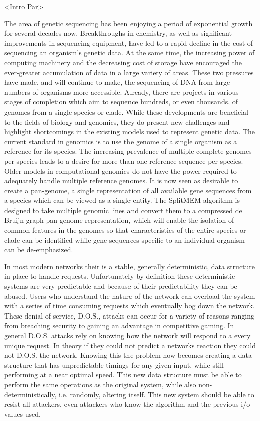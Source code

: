\documentclass{paper}
\begin{document}
<Intro Par>
\newline\newline

The area of genetic sequencing has been enjoying a period of exponential
growth for several decades now. Breakthroughs in chemistry, as well as 
significant improvements in sequencing equipment, have led to a rapid 
decline in the cost of sequencing an organism's genetic data. At the 
same time, the increasing power of computing machinery and the decreasing
cost of storage have encouraged the ever-greater accumulation of data in 
a large variety of areas. These two pressures have made, and will 
continue to make, the sequencing of DNA from large numbers of organisms 
more accessible. Already, there are projects in various stages of 
completion which aim to sequence hundreds, or even thousands, of genomes 
from a single species or clade. While these developments are beneficial 
to the fields of biology and genomics, they do present new challenges 
and highlight shortcomings in the existing models used to represent 
genetic data. The current standard in genomics is to use the genome of a 
single organism as a reference for its species. The increasing prevalence
of multiple complete genomes per species leads to a desire for more than
one reference sequence per species. Older models in computational 
genomics do not have the power required to adequately handle multiple 
reference genomes. It is now seen as desirable to create a pan-genome, 
a single representation of all available gene sequences from a species 
which can be viewed as a single entity. The SplitMEM algorithm is 
designed to take multiple genomic lines and convert them to a compressed
 de Bruijn graph pan-genome representation, which will enable the 
 isolation of common features in the genomes so that characteristics 
 of the entire species or clade can be identified while gene sequences 
 specific to an individual organism can be de-emphasized.


In most modern networks their is a stable, generally deterministic, data
structure in place to handle requests. Unfortunately by definition these
deterministic systems are very predictable and because of their
predictability they can be abused. Users who understand the nature of 
the network can overload the system with a series of time consuming
requests which eventually bog down the network. These denial-of-service,
D.O.S., attacks can occur for a variety of reasons ranging from 
breaching security to gaining an advantage in competitive gaming. In 
general D.O.S. attacks rely on knowing how the network will respond to 
a every unique request. In theory if they could not predict a networks 
reaction they could not D.O.S. the network. Knowing this the problem 
now becomes creating a data structure that has unpredictable timings 
for any given input, while still performing at a near optimal speed. 
This new data structure must be able to perform the same operations as 
the original system, while also non-deterministically, i.e. randomly, 
altering itself. This new system should be able to resist all attackers,
 even attackers who know the algorithm and the previous i/o values used. 
\end{document}
